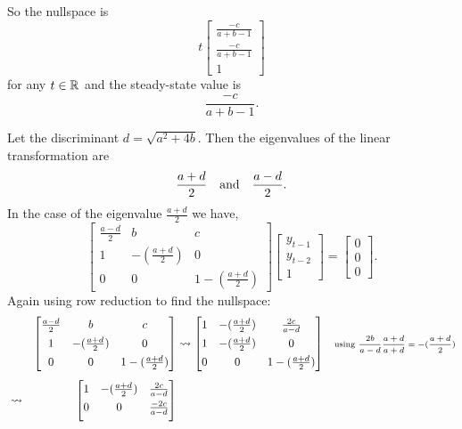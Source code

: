 \documentclass[../MathsNotesBase.tex]{subfiles}
\begin{document}
{	  	So the nullspace is
	  	\[ t\begin{bmatrix}
		  		\frac{-c}{a+b-1} \\[4pt] \frac{-c}{a+b-1} \\[4pt] 1	
		  	\end{bmatrix} 
		\]
		for any ${ t \in \mathbb{R}^{} }$ and the steady-state value is
		\[ \frac{-c}{a+b-1}. \]
		
		\bigskip
		Let the discriminant ${ d = \sqrt{a^2 + 4b} }$. Then the eigenvalues of the linear transformation are
		\[ \frac{a + d}{2} \hspace{10pt}\text{and}\hspace{10pt} \frac{a - d}{2}. \]
		In the case of the eigenvalue ${ \frac{a + d}{2} }$ we have,
		\[
		\begin{bmatrix}
			\frac{a - d}{2} &  b & c \\
			1   & -(\frac{a + d}{2}) & 0 \\
			0   &  0 & 1-(\frac{a + d}{2})
		\end{bmatrix}
		\begin{bmatrix}y_{t-1}\\y_{t-2}\\1\end{bmatrix} =
		\begin{bmatrix}0\\0\\0\end{bmatrix}. 
		\]
		Again using row reduction to find the nullspace:
		\begin{align*}
		&& 	\begin{bmatrix}
			\frac{a - d}{2} &  b & c \\[4pt]
			1   & -(\frac{a + d}{2}) & 0 \\[4pt]
			0   &  0 & 1-(\frac{a + d}{2})	
		\end{bmatrix} &\leadsto
		\begin{bmatrix}
			1   & -(\frac{a + d}{2}) & \frac{2c}{a - d} \\[4pt]
			1   & -(\frac{a + d}{2}) & 0 \\[4pt]
			0   &  0 & 1-(\frac{a + d}{2})
		\end{bmatrix} &\text{\scriptsize{using ${ \frac{2b}{a - d}\frac{a + d}{a + d} = -(\frac{a + d}{2}) }$}}\\[4pt]
		&\leadsto & 
		\begin{bmatrix}
			1   & -(\frac{a + d}{2}) & \frac{2c}{a - d} \\[4pt]
			0   &  0 & \frac{-2c}{a - d} \\[4pt]

\end{bmatrix}
\end{align*}}
\end{document}
